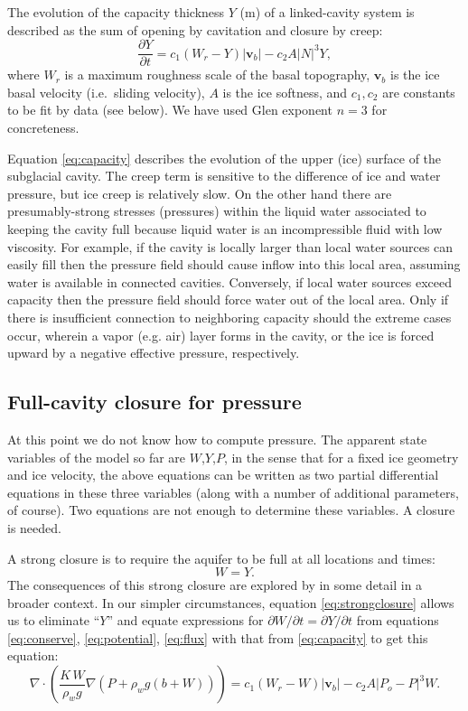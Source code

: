 \documentclass[12pt,final]{amsart}%
\newcommand\bv{\mathbf{v}}
\newcommand{\Div}{\nabla\cdot}
\newcommand{\grad}{\nabla}
\begin{document}
The evolution of the capacity thickness $Y$ (m) of a linked-cavity system is described as the sum of opening by cavitation and closure by creep:
\begin{equation}
\frac{\partial Y}{\partial t} = c_1 \left(W_r - Y\right) |\bv_b| - c_2 A |N|^3 Y, \label{eq:capacity}
\end{equation}
where $W_r$ is a maximum roughness scale of the basal topography, $\bv_b$ is the ice basal velocity (i.e.~sliding velocity), $A$ is the ice softness, and $c_1,c_2$ are constants to be fit by data (see below).  We have used Glen exponent $n=3$ for concreteness.

Equation \eqref{eq:capacity} describes the evolution of the upper (ice) surface of the subglacial cavity.  The creep term is sensitive to the difference of ice and water pressure, but ice creep is relatively slow.  On the other hand there are presumably-strong stresses (pressures) within the liquid water associated to keeping the cavity full because liquid water is an incompressible fluid with low viscosity.  For example, if the cavity is locally larger than local water sources can easily fill then the pressure field should cause inflow into this local area, assuming water is available in connected cavities.  Conversely, if local water sources exceed capacity then the pressure field should force water out of the local area.  Only if there is insufficient connection to neighboring capacity should the extreme cases occur, wherein a vapor (e.g. air) layer forms in the cavity, or the ice is forced upward by a negative effective pressure, respectively.

\subsection*{Full-cavity closure for pressure}  At this point we do not know how to compute pressure.  The apparent state variables of the model so far are $W$,$Y$,$P$, in the sense that for a fixed ice geometry and ice velocity, the above equations can be written as two partial differential equations in these three variables (along with a number of additional parameters, of course).  Two equations are not enough to determine these variables.  A closure is needed.

A strong closure is to require the aquifer to be full at all locations and times:
\begin{equation}
W = Y.\label{eq:strongclosure}
\end{equation}
The consequences of this strong closure are explored by \cite{Schoofetal2012} in some detail in a broader context.  In our simpler circumstances, equation \eqref{eq:strongclosure} allows us to eliminate ``$Y$'' and equate expressions for $\partial W/\partial t = \partial Y/\partial t$ from equations \eqref{eq:conserve}, \eqref{eq:potential}, \eqref{eq:flux} with that from \eqref{eq:capacity} to get this equation:
\begin{equation}
\Div \left(\frac{K\,W}{\rho_w g} \grad \left(P + \rho_w g (b+W)\right) \right) = c_1 \left(W_r - W\right) |\bv_b| - c_2 A |P_o - P|^3 W.\label{eq:ellipticpressure}
\end{equation}
\end{document}
